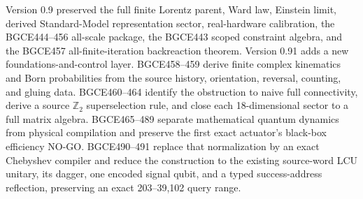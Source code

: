 \documentclass[11pt]{article}
\theoremstyle{definition}
\theoremstyle{remark}
\begin{document}
Version 0.9 preserved the full finite Lorentz parent, Ward law, Einstein limit, derived Standard-Model representation sector, real-hardware calibration, the BGCE444--456 all-scale package, the BGCE443 scoped constraint algebra, and the BGCE457 all-finite-iteration backreaction theorem. Version 0.91 adds a new foundations-and-control layer. BGCE458--459 derive finite complex kinematics and Born probabilities from the source history, orientation, reversal, counting, and gluing data. BGCE460--464 identify the obstruction to naive full connectivity, derive a source $\mathbb Z_2$ superselection rule, and close each 18-dimensional sector to a full matrix algebra. BGCE465--489 separate mathematical quantum dynamics from physical compilation and preserve the first exact actuator's black-box efficiency NO-GO. BGCE490--491 replace that normalization by an exact Chebyshev compiler and reduce the construction to the existing source-word LCU unitary, its dagger, one encoded signal qubit, and a typed success-address reflection, preserving an exact 203--39,102 query range.
\end{document}
